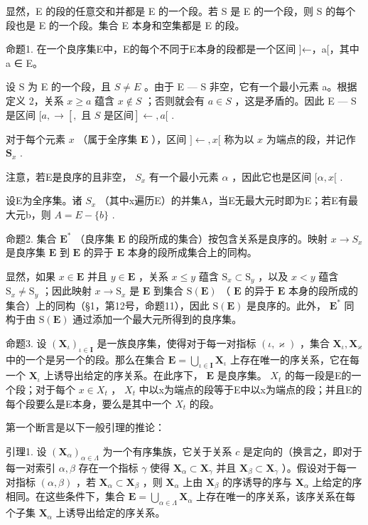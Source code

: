 显然，E 的段的任意交和并都是 E 的一个段。若 S 是 E 的一个段，则 S 的每个段也是 E 的一个段。集合 E 本身和空集都是 E 的段。

命题1. 在一个良序集E中，E的每个不同于E本身的段都是一个区间 {]}←，a{[}，其中 a ∈ E。

设 S 为 E 的一个段，且 \(S \neq E\) 。由于 E --- S 非空，它有一个最小元素 a。根据定义 2，关系 \(x \geqslant a\) 蕴含 \(x \notin S\) ；否则就会有 \(a \in S\) ，这是矛盾的。因此 E --- S 是区间 \([a, \rightarrow[, \text{ 且 } S \text{ 是区间}] \leftarrow, a[\) .

对于每个元素 \(x\) （属于全序集 \(\mathbf{E}\) ），区间 \(] \leftarrow, x[\) 称为以 \(x\) 为端点的段，并记作 \(\mathbf{S}_x\) .

注意，若E是良序的且非空， \(S_{x}\) 有一个最小元素 \(\alpha\) ，因此它也是区间 \([\alpha, x[\) .

设E为全序集。诸 \(S_{x}\) （其中x遍历E）的并集A，当E无最大元时即为E；若E有最大元b，则 \(A = E - \{b\}\) .

命题2. 集合 \(\mathbf{E}^*\) （良序集 \(\mathbf{E}\) 的段所成的集合）按包含关系是良序的。映射 \(x \to S_x\) 是良序集 \(\mathbf{E}\) 到 \(\mathbf{E}\) 的异于 \(\mathbf{E}\) 本身的段所成集合上的同构。

显然，如果 \(x \in \mathbf{E}\) 并且 \(y \in \mathbf{E}\) ，关系 \(x \leqslant y\) 蕴含 \(\mathrm{S}_x \subset \mathrm{S}_y\) ，以及 \(x < y\) 蕴含 \(\mathrm{S}_x \neq \mathrm{S}_y\) ；因此映射 \(x \to \mathrm{S}_x\) 是 \(\mathbf{E}\) 到集合 \(\mathrm{S}(\mathbf{E})\) （ \(\mathbf{E}\) 的异于 \(\mathbf{E}\) 本身的段所成的集合）上的同构（§1，第12号，命题11），因此 \(\mathrm{S}(\mathbf{E})\) 是良序的。此外， \(\mathbf{E}^*\) 同构于由 \(\mathrm{S}(\mathbf{E})\) 通过添加一个最大元所得到的良序集。

命题3. 设 \((\mathbf{X}_{\iota})_{\iota \in \mathbf{I}}\) 是一族良序集，使得对于每一对指标 \((\iota, \varkappa)\) ，集合 \(\mathbf{X}_{\iota}, \mathbf{X}_{\varkappa}\) 中的一个是另一个的段。那么在集合 \(\mathbf{E} = \bigcup_{\iota \in \mathbf{I}} \mathbf{X}_{\iota}\) 上存在唯一的序关系，它在每一个 \(\mathbf{X}_{\iota}\) 上诱导出给定的序关系。在此序下， \(\mathbf{E}\) 是良序集。 \(X_{t}\) 的每一段是E的一个段；对于每个 \(x \in X_{t}\) ， \(X_{t}\) 中以x为端点的段等于E中以x为端点的段；并且E的每个段要么是E本身，要么是其中一个 \(X_{t}\) 的段。

第一个断言是以下一般引理的推论：

引理1. 设 \((\mathbf{X}_{\alpha})_{\alpha \in \Lambda}\) 为一个有序集族，它关于关系 \(c\) 是定向的（换言之，即对于每一对索引 \(\alpha, \beta\) 存在一个指标 \(\gamma\) 使得 \(\mathbf{X}_{\alpha} \subset \mathbf{X}_{\gamma}\) 并且 \(\mathbf{X}_{\beta} \subset \mathbf{X}_{\gamma}\) ）。假设对于每一对指标 \((\alpha, \beta)\) ，若 \(\mathbf{X}_{\alpha} \subset \mathbf{X}_{\beta}\) ，则 \(\mathbf{X}_{\alpha}\) 上由 \(\mathbf{X}_{\beta}\) 的序诱导的序与 \(\mathbf{X}_{\alpha}\) 上给定的序相同。在这些条件下，集合 \(\mathbf{E} = \bigcup_{\alpha \in \Lambda} \mathbf{X}_{\alpha}\) 上存在唯一的序关系，该序关系在每个子集 \(\mathbf{X}_{\alpha}\) 上诱导出给定的序关系。

